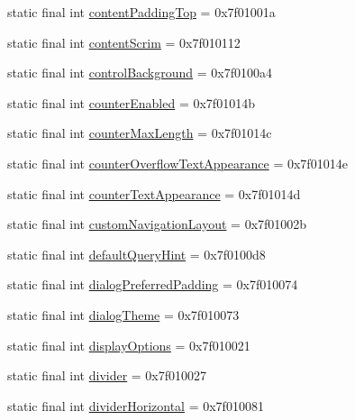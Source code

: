 \begin{CompactItemize}
\item 
static final int \hyperlink{classandroid_1_1support_1_1v7_1_1palette_1_1_r_1_1attr_cf09348c470a3e4526a71212a4290403}{contentPaddingTop} = 0x7f01001a
\item 
static final int \hyperlink{classandroid_1_1support_1_1v7_1_1palette_1_1_r_1_1attr_077268be42cb6198939193ab2f30f832}{contentScrim} = 0x7f010112
\item 
static final int \hyperlink{classandroid_1_1support_1_1v7_1_1palette_1_1_r_1_1attr_9228aa146ccecf5e2f570bc665024b81}{controlBackground} = 0x7f0100a4
\item 
static final int \hyperlink{classandroid_1_1support_1_1v7_1_1palette_1_1_r_1_1attr_40c267b0c49aa467c1480f6008eb51e6}{counterEnabled} = 0x7f01014b
\item 
static final int \hyperlink{classandroid_1_1support_1_1v7_1_1palette_1_1_r_1_1attr_acda3bcc1fb3595df96078a534f06ed6}{counterMaxLength} = 0x7f01014c
\item 
static final int \hyperlink{classandroid_1_1support_1_1v7_1_1palette_1_1_r_1_1attr_119cffe0f5553bfd0a00f3e7fcb64b23}{counterOverflowTextAppearance} = 0x7f01014e
\item 
static final int \hyperlink{classandroid_1_1support_1_1v7_1_1palette_1_1_r_1_1attr_7c5e26080cd9d97e95a399db3f1ff6bf}{counterTextAppearance} = 0x7f01014d
\item 
static final int \hyperlink{classandroid_1_1support_1_1v7_1_1palette_1_1_r_1_1attr_ca883b08c0e9c51ab35a2b7b9578205b}{customNavigationLayout} = 0x7f01002b
\item 
static final int \hyperlink{classandroid_1_1support_1_1v7_1_1palette_1_1_r_1_1attr_77939e64cd357a1b760095c38cf822ef}{defaultQueryHint} = 0x7f0100d8
\item 
static final int \hyperlink{classandroid_1_1support_1_1v7_1_1palette_1_1_r_1_1attr_c4dddbb2a75a290b41d57a20e74c7c72}{dialogPreferredPadding} = 0x7f010074
\item 
static final int \hyperlink{classandroid_1_1support_1_1v7_1_1palette_1_1_r_1_1attr_fda033458b65e0a41923f4f34ad15719}{dialogTheme} = 0x7f010073
\item 
static final int \hyperlink{classandroid_1_1support_1_1v7_1_1palette_1_1_r_1_1attr_aaa6874d428d8a78d705ffd8e8ecac69}{displayOptions} = 0x7f010021
\item 
static final int \hyperlink{classandroid_1_1support_1_1v7_1_1palette_1_1_r_1_1attr_f76994e11ca97636ba703f13387a9aba}{divider} = 0x7f010027
\item 
static final int \hyperlink{classandroid_1_1support_1_1v7_1_1palette_1_1_r_1_1attr_a17b4e390f34a0792d3fa726de45089a}{dividerHorizontal} = 0x7f010081

\end{CompactItemize}
